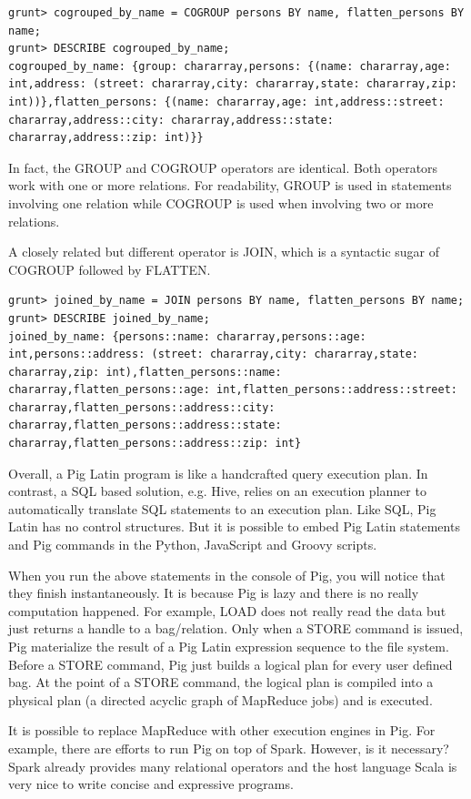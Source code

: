 \documentclass[11pt]{book}
\begin{document}
\begin{lstlisting}
grunt> cogrouped_by_name = COGROUP persons BY name, flatten_persons BY name;
grunt> DESCRIBE cogrouped_by_name;
cogrouped_by_name: {group: chararray,persons: {(name: chararray,age: int,address: (street: chararray,city: chararray,state: chararray,zip: int))},flatten_persons: {(name: chararray,age: int,address::street: chararray,address::city: chararray,address::state: chararray,address::zip: int)}}
\end{lstlisting}
In fact, the GROUP and COGROUP operators are identical. Both operators work with one or more relations. For readability, GROUP is used in statements involving one relation while COGROUP is used when involving two or more relations.

A closely related but different operator is JOIN, which is a syntactic sugar of COGROUP followed by FLATTEN.

\begin{lstlisting}
grunt> joined_by_name = JOIN persons BY name, flatten_persons BY name;
grunt> DESCRIBE joined_by_name;
joined_by_name: {persons::name: chararray,persons::age: int,persons::address: (street: chararray,city: chararray,state: chararray,zip: int),flatten_persons::name: chararray,flatten_persons::age: int,flatten_persons::address::street: chararray,flatten_persons::address::city: chararray,flatten_persons::address::state: chararray,flatten_persons::address::zip: int}
\end{lstlisting}
Overall, a Pig Latin program is like a handcrafted query execution plan. In contrast, a SQL based solution, e.g. Hive, relies on an execution planner to automatically translate SQL statements to an execution plan. Like SQL, Pig Latin has no control structures. But it is possible to embed Pig Latin statements and Pig commands in the Python, JavaScript and Groovy scripts.

When you run the above statements in the console of Pig, you will notice that they finish instantaneously. It is because Pig is lazy and there is no really computation happened. For example, LOAD does not really read the data but just returns a handle to a bag/relation. Only when a STORE command is issued, Pig materialize the result of a Pig Latin expression sequence to the file system. Before a STORE command, Pig just builds a logical plan for every user defined bag. At the point of a STORE command, the logical plan is compiled into a physical plan (a directed acyclic graph of MapReduce jobs) and is executed.

It is possible to replace MapReduce with other execution engines in Pig. For example, there are efforts to run Pig on top of Spark. However, is it necessary? Spark already provides many relational operators and the host language Scala is very nice to write concise and expressive programs.
\end{document}
